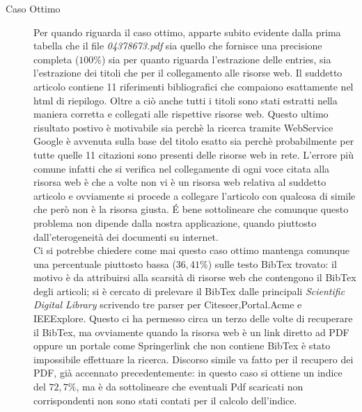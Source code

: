 \begin{description}
	\item[Caso Ottimo] Per quando riguarda il caso ottimo, apparte subito evidente dalla prima tabella che il file \textit{04378673.pdf} sia quello che fornisce una precisione completa ($100\%$) sia per quanto riguarda l'estrazione delle entries, sia l'estrazione dei titoli che per il collegamento alle risorse web. Il suddetto articolo contiene 11 riferimenti bibliografici che compaiono esattamente nel html di riepilogo. Oltre a ciò anche tutti i titoli sono stati estratti nella maniera corretta e collegati alle rispettive risorse web. Questo ultimo risultato postivo è motivabile sia perchè la ricerca tramite WebService Google è avvenuta sulla base del titolo esatto sia perchè probabilmente per tutte quelle 11 citazioni sono presenti delle risorse web in rete. L'errore più comune infatti che si verifica nel collegamente di ogni voce citata alla risorsa web è che a volte non vi è un risorsa web relativa al suddetto articolo e ovviamente si procede a collegare l'articolo con qualcosa di simile che però non è la risorsa giusta. \'E bene sottolineare che comunque questo problema non dipende dalla nostra applicazione, quando piuttosto dall'eterogeneità dei documenti su internet.\\

Ci si potrebbe chiedere come mai questo caso ottimo mantenga comunque una percentuale piuttosto bassa ($36,41\%$) sulle testo BibTex trovato: il motivo è da attribuirsi alla scarsità di risorse web che contengono il BibTex degli articoli; si è cercato di prelevare il BibTex dalle principali \textit{Scientific Digital Library} scrivendo tre parser per Citeseer,Portal.Acme e IEEExplore. Questo ci ha permesso circa un terzo delle volte di recuperare il BibTex, ma ovviamente quando la risorsa web è un link diretto ad PDF oppure un portale come Springerlink che non contiene BibTex è stato impossibile effettuare la ricerca. Discorso simile va fatto per il recupero dei PDF, già accennato precedentemente: in questo caso si ottiene un indice del $72,7\%$, ma è da sottolineare che eventuali Pdf scaricati non corrispondenti non sono stati contati per il calcolo dell'indice.
\end{description}


